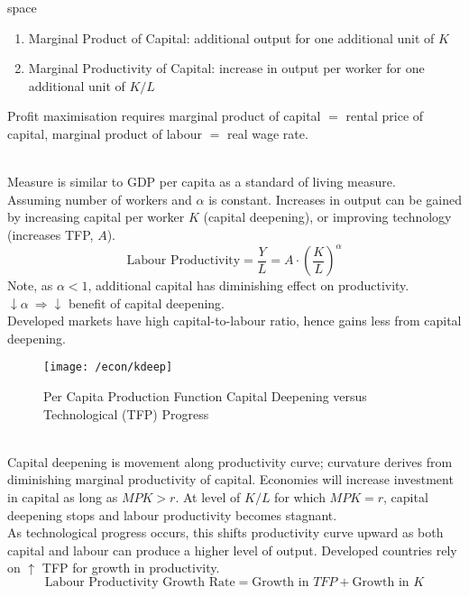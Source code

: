 \begin{definition} {\color{white}space}
\begin{enumerate}[label=\roman*.]
\setlength{\itemsep}{0pt}
\item Marginal Product of Capital: additional output for one additional unit of $K$
\item Marginal Productivity of Capital: increase in output per worker for one additional unit of $K/L$
\end{enumerate}
Profit maximisation requires marginal product of capital $=$ rental price of capital, marginal product of labour $=$ real wage rate.
\end{definition}

\begin{definition} \\
Measure is similar to GDP per capita as a standard of living measure.\\
Assuming number of workers and $\alpha$ is constant. Increases in output can be gained by increasing capital per worker $K$ (capital deepening), or improving technology (increases TFP, $A$).
\begin{equation}
\text{Labour Productivity} = \frac{Y}{L} = A \cdot \left( \frac{K}{L} \right)^{\alpha} \nonumber
\end{equation}
Note, as $\alpha < 1$, additional capital has diminishing effect on productivity. $\downarrow \alpha \ \Rightarrow \downarrow$ benefit of capital deepening.\\
Developed markets have high capital-to-labour ratio, hence gains less from capital deepening.
\end{definition}

\begin{figure}[H]
\centering
\texttt{[image: /econ/kdeep]}
\caption{Per Capita Production Function Capital Deepening versus Technological (TFP) Progress}
\end{figure}

\begin{remark} \\
Capital deepening is movement along productivity curve; curvature derives from diminishing marginal productivity of capital. Economies will increase investment in capital as long as $MPK > r$. At level of $K/L$ for which $MPK = r$, capital deepening stops and labour productivity becomes stagnant.\\
As technological progress occurs, this shifts productivity curve upward as both capital and labour can produce a higher level of output. Developed countries rely on $\uparrow$ TFP for growth in productivity.
\begin{equation}
\text{Labour Productivity Growth Rate} = \text{Growth in $TFP$} + \text{Growth in $K$} \nonumber
\end{equation}
\end{remark}

